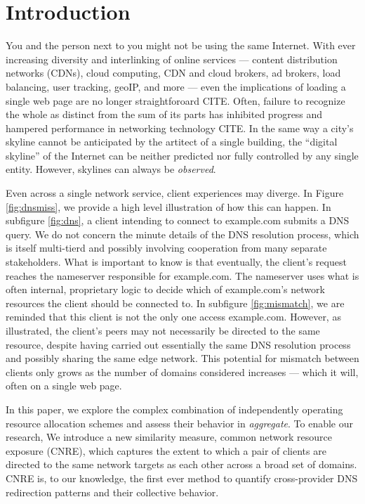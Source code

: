 \section{Introduction} \label{sect:intro}

You and the person next to you might not be using the same Internet. With
ever increasing diversity and interlinking of online services  --- content distribution networks (CDNs), cloud computing, CDN and
cloud brokers, ad brokers, load balancing, user tracking, geoIP, and more --- even the
implications
of loading a single web page are no longer straightforoard CITE. Often, failure to
recognize the whole as distinct from the sum of its parts has inhibited progress
and hampered performance in networking technology CITE. In the same way a city's
skyline cannot be anticipated by the artitect of a single  building, the
``digital skyline'' of the Internet can be neither predicted nor fully
controlled by any single entity.
However, skylines can always be \emph{observed}.

Even across a single network service, client experiences may diverge. In Figure
\ref{fig:dnsmiss}, we provide a high level illustration of how this can happen.
In subfigure \ref{fig:dns},  a client intending to connect to example.com submits a DNS query. We do not
concern the minute details of
the DNS resolution process, which is itself multi-tierd and possibly involving
cooperation from many separate stakeholders. What is important to know is that
eventually, the client's request reaches the nameserver responsible for
example.com. The nameserver uses what is often internal, proprietary
logic to decide which of example.com's network resources the client should be
connected to. In subfigure \ref{fig:mismatch}, we are reminded that this client
is not the only one access example.com. However, as illustrated,
the client's peers may not necessarily be directed to the same resource, despite
having carried out essentially the same DNS resolution process and possibly
sharing the same edge network. This potential for mismatch between clients only
grows as the number of domains considered increases --- which it will, often on
a single web page.

In this paper, we explore the complex combination of independently operating
resource allocation schemes and assess their behavior in \emph{aggregate}. To
enable our research, We introduce a new similarity measure, common network
resource exposure (CNRE), which captures the extent to which a pair of clients
are directed to the same network targets as each other across a broad set of
domains. CNRE is, to our knowledge, the first ever method to quantify
cross-provider DNS redirection patterns and their collective behavior. 

